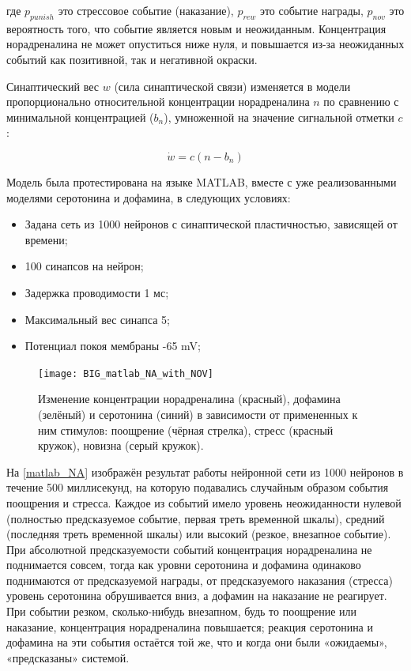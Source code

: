 где $p_{punish}$ это стрессовое событие (наказание), $p_{rew}$ это событие награды, $p_{nov}$ это вероятность того, что событие является новым и неожиданным. Концентрация норадреналина не может опуститься ниже нуля, и повышается из-за неожиданных событий как позитивной, так и негативной окраски.


Синаптический вес $w$ (сила синаптической связи) изменяется в модели пропорционально относительной концентрации норадреналина $n$ по сравнению с минимальной концентрацией ($b_n$), умноженной на значение сигнальной отметки $c$:

\begin{equation}\label{eq:6}
\dot{w} = c(n - b_n)
\end{equation}


Модель была протестирована на языке MATLAB, вместе с уже реализованными моделями серотонина и дофамина, в следующих условиях:
\begin{itemize}
\item Задана сеть из 1000 нейронов с синаптической пластичностью, зависящей от времени;
\item 100 синапсов на нейрон;
\item Задержка проводимости 1 мс;
\item Максимальный вес синапса 5;
\item Потенциал покоя мембраны -65 mV;
\end{itemize}

\begin{figure}
	\centering
	\texttt{[image: BIG\_matlab\_NA\_with\_NOV]}
	\caption{Изменение концентрации норадреналина (красный), дофамина (зелёный) и серотонина (синий) в зависимости от примененных к ним стимулов: поощрение (чёрная стрелка), стресс (красный кружок), новизна (серый кружок).}
	\label{fig:matlab_NA}
\end{figure}

На \ref{matlab_NA} изображён результат работы нейронной сети из 1000 нейронов в течение 500 миллисекунд, на которую подавались случайным образом события поощрения и стресса. Каждое из событий имело уровень неожиданности нулевой (полностью предсказуемое событие, первая треть временной шкалы), средний (последняя треть временной шкалы) или высокий (резкое, внезапное событие).
При абсолютной предсказуемости событий концентрация норадреналина не поднимается совсем, тогда как уровни серотонина и дофамина одинаково поднимаются от предсказуемой награды, от предсказуемого наказания (стресса) уровень серотонина обрушивается вниз, а дофамин на наказание не реагирует.
При событии резком, сколько-нибудь внезапном, будь то поощрение или наказание, концентрация норадреналина повышается; реакция серотонина и дофамина на эти события остаётся той же, что и когда они были «ожидаемы», «предсказаны» системой.


